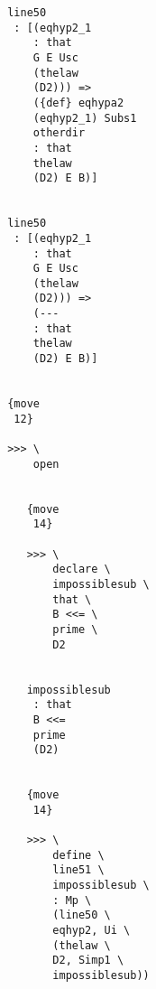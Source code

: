 \documentclass[12pt]{article}
\begin{document}
\begin{verbatim}
                                       line50 
                                        : [(eqhyp2_1 
                                           : that 
                                           G E Usc 
                                           (thelaw 
                                           (D2))) => 
                                           ({def} eqhypa2 
                                           (eqhyp2_1) Subs1 
                                           otherdir 
                                           : that 
                                           thelaw 
                                           (D2) E B)]


                                       line50 
                                        : [(eqhyp2_1 
                                           : that 
                                           G E Usc 
                                           (thelaw 
                                           (D2))) => 
                                           (--- 
                                           : that 
                                           thelaw 
                                           (D2) E B)]


                                       {move 
                                        12}

                                       >>> \
                                           open


                                          {move 
                                           14}

                                          >>> \
                                              declare \
                                              impossiblesub \
                                              that \
                                              B <<= \
                                              prime \
                                              D2


                                          impossiblesub 
                                           : that 
                                           B <<= 
                                           prime 
                                           (D2)


                                          {move 
                                           14}

                                          >>> \
                                              define \
                                              line51 \
                                              impossiblesub \
                                              : Mp \
                                              (line50 \
                                              eqhyp2, Ui \
                                              (thelaw \
                                              D2, Simp1 \
                                              impossiblesub))



\end{verbatim}
\end{document}
